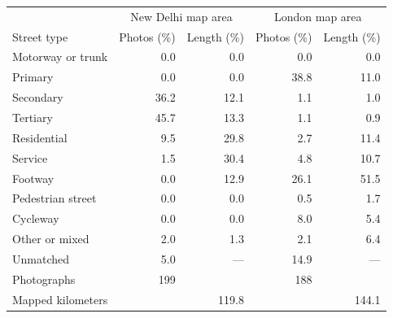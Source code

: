 \begin{tabular}{@{}lrrrr@{}}
\toprule
 & \multicolumn{2}{c}{New Delhi map area} & \multicolumn{2}{c}{London map area} \\
Street type & Photos (\%) & Length (\%) & Photos (\%) & Length (\%) \\
\midrule
Motorway or trunk & 0.0 & 0.0 & 0.0 & 0.0 \\
Primary & 0.0 & 0.0 & 38.8 & 11.0 \\
Secondary & 36.2 & 12.1 & 1.1 & 1.0 \\
Tertiary & 45.7 & 13.3 & 1.1 & 0.9 \\
Residential & 9.5 & 29.8 & 2.7 & 11.4 \\
Service & 1.5 & 30.4 & 4.8 & 10.7 \\
Footway & 0.0 & 12.9 & 26.1 & 51.5 \\
Pedestrian street & 0.0 & 0.0 & 0.5 & 1.7 \\
Cycleway & 0.0 & 0.0 & 8.0 & 5.4 \\
Other or mixed & 2.0 & 1.3 & 2.1 & 6.4 \\
Unmatched & 5.0 & — & 14.9 & — \\
Photographs & 199 &  & 188 &  \\
Mapped kilometers &  & 119.8 &  & 144.1 \\
\bottomrule
\end{tabular}
